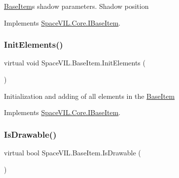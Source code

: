 \mbox{\hyperlink{class_space_v_i_l_1_1_base_item}{Base\+Item}}\textquotesingle{}s shadow parameters. Shadow position 



Implements \mbox{\hyperlink{interface_space_v_i_l_1_1_core_1_1_i_base_item}{Space\+V\+I\+L.\+Core.\+I\+Base\+Item}}.

\mbox{\label{class_space_v_i_l_1_1_base_item_a8dd530484abb5ad9ba9abd92117e735b}} 
\subsubsection{\texorpdfstring{Init\+Elements()}{InitElements()}}
{\footnotesize\ttfamily virtual void Space\+V\+I\+L.\+Base\+Item.\+Init\+Elements (\begin{DoxyParamCaption}{ }\end{DoxyParamCaption})\hspace{0.3cm}{\ttfamily [virtual]}}



Initialization and adding of all elements in the \mbox{\hyperlink{class_space_v_i_l_1_1_base_item}{Base\+Item}} 



Implements \mbox{\hyperlink{interface_space_v_i_l_1_1_core_1_1_i_base_item}{Space\+V\+I\+L.\+Core.\+I\+Base\+Item}}.

\mbox{\label{class_space_v_i_l_1_1_base_item_a002a247f3745be1e1e57c504589d7036}} 
\subsubsection{\texorpdfstring{Is\+Drawable()}{IsDrawable()}}
{\footnotesize\ttfamily virtual bool Space\+V\+I\+L.\+Base\+Item.\+Is\+Drawable (\begin{DoxyParamCaption}{ }\end{DoxyParamCaption})\hspace{0.3cm}{\ttfamily [virtual]}}



